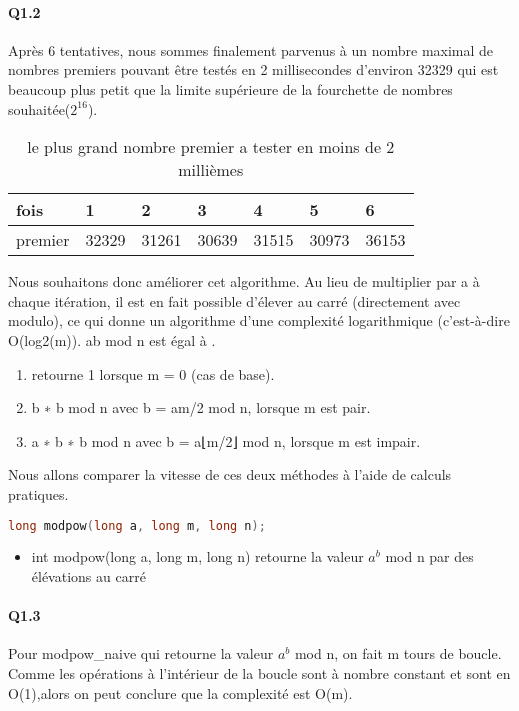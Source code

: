 \documentclass{article}
\begin{document}
\paragraph*{Q1.2}
Après 6 tentatives, nous sommes finalement parvenus à un nombre maximal de nombres premiers pouvant être testés en 2 millisecondes d'environ 32329 qui est beaucoup plus petit que la limite supérieure de la fourchette de nombres souhaitée($2^16$).\newline
\begin{table}[H]
\centering
\begin{tabular}{|l|l|l|l|l|l|l|}
\hline
fois    & 1     & 2     & 3     & 4     & 5     & 6     \\ \hline
premier & 32329 & 31261 & 30639 & 31515 & 30973 & 36153 \\ \hline
\end{tabular}
\caption{le plus grand nombre premier a tester en moins de 2 millièmes}
\end{table}
\newline Nous souhaitons donc améliorer cet algorithme. Au lieu de multiplier par a à chaque itération, il est en fait possible d'élever au carré (directement avec modulo), ce qui donne un algorithme d'une complexité logarithmique (c'est-à-dire O(log2(m)).\newline
ab mod n est égal à .
\begin{enumerate}
\item retourne 1 lorsque m = 0 (cas de base).
\item b ∗ b mod n avec b = am/2 mod n, lorsque m est pair.
\item a ∗ b ∗ b mod n avec b = a⌊m/2⌋ mod n, lorsque m est impair.
\end{enumerate}
Nous allons comparer la vitesse de ces deux méthodes à l'aide de calculs pratiques.
\begin{lstlisting}[language={C}]
long modpow(long a, long m, long n);
\end{lstlisting}
\begin{itemize}
\item int modpow(long a, long m, long n) retourne la valeur $a^b$ mod n par des élévations au carré
\end{itemize}
\paragraph*{Q1.3}
Pour modpow\_naive qui retourne la valeur $a^b$ mod n, on fait m tours de boucle. Comme les opérations à l'intérieur de la boucle sont à nombre constant et sont en O(1),alors on peut conclure que la complexité est O(m).
\end{document}
